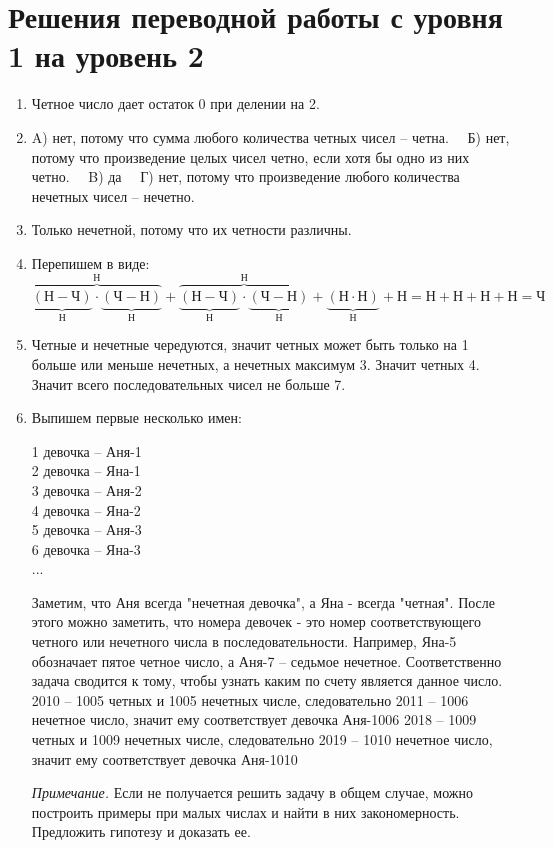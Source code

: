 \section{ Решения переводной работы с уровня 1 на уровень 2}
\begin{enumerate}
	\item Четное число дает остаток 0 при делении на 2.
	\item A) нет, потому что сумма любого количества четных чисел -- четна.~~ Б) нет, потому что произведение целых чисел четно, если хотя бы одно из них четно.~~ B) да ~~Г) нет, потому что произведение любого количества нечетных чисел -- нечетно.
	\item Только нечетной, потому что их четности различны.
	\item Перепишем в виде: $\overbrace{\underbrace{(Н-Ч)}_{Н}\cdot\underbrace{(Ч-Н)}_{Н}}^{Н}+\overbrace{\underbrace{(Н-Ч)}_{Н}\cdot\underbrace{(Ч-Н)}_{Н}}^{Н}+\underbrace{(Н\cdot Н)}_{Н}+Н=Н+Н+Н+Н=Ч$
	\item Четные и нечетные чередуются, значит четных может быть только на 1 больше или меньше нечетных, а нечетных максимум 3. Значит четных 4. Значит всего последовательных чисел не больше 7.
	\newpage
	\item Выпишем первые несколько имен:
	\begin{center}
		1 девочка -- Аня-1\\
	2 девочка -- Яна-1\\
	3 девочка -- Аня-2\\
	4 девочка -- Яна-2\\
	5 девочка -- Аня-3\\
	6 девочка -- Яна-3\\
	...\\
	\end{center}
Заметим, что Аня всегда "нечетная девочка", а Яна - всегда "четная". После этого можно заметить, что номера девочек - это номер соответствующего четного или нечетного числа в последовательности. Например, Яна-5 обозначает пятое четное число, а Аня-7 -- седьмое нечетное.
	Соответственно задача сводится к тому, чтобы узнать каким по счету является данное число.
	2010 -- 1005 четных и 1005 нечетных числе, следовательно 2011 -- 1006 нечетное число, значит ему соответствует девочка Аня-1006
	2018 -- 1009 четных и 1009 нечетных числе, следовательно 2019 -- 1010 нечетное число, значит ему соответствует девочка Аня-1010
	
	\textit{Примечание.} Если не получается решить задачу в общем случае, можно построить примеры при малых числах и найти в них закономерность. Предложить гипотезу и доказать ее.
\end{enumerate}